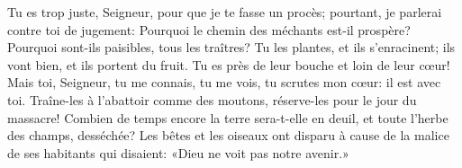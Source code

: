 Tu es trop juste, Seigneur, pour que je te fasse un procès;
	pourtant, je parlerai contre toi de jugement:
	Pourquoi le chemin des méchants est-il prospère?
	Pourquoi sont-ils paisibles, tous les traîtres?
Tu les plantes, et ils s’enracinent; ils vont bien, et ils portent du fruit.
	Tu es près de leur bouche et loin de leur cœur!
Mais toi, Seigneur, tu me connais, tu me vois, tu scrutes mon cœur:
	il est avec toi.
Traîne-les à l’abattoir comme des moutons,
	réserve-les pour le jour du massacre!
Combien de temps encore la terre sera-t-elle en deuil,
	et toute l’herbe des champs, desséchée?
	Les bêtes et les oiseaux ont disparu à cause de la malice de ses habitants
	qui disaient: «Dieu ne voit pas notre avenir.»
